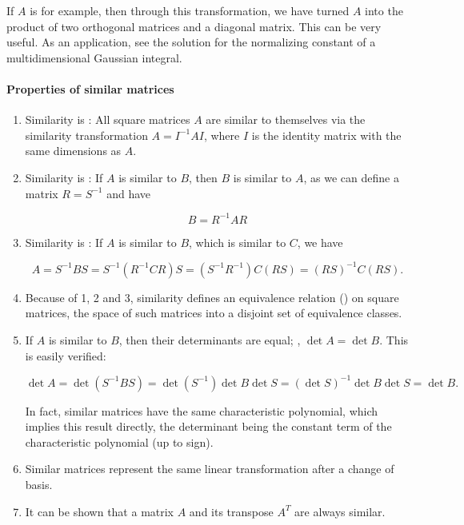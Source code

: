 \documentclass[12pt]{article}
\begin{document}
If $A$ is  for example, then through this transformation, we have turned $A$ into the product of two orthogonal matrices and a diagonal matrix.  This can be very useful.  As an application, see the solution for the normalizing constant of a multidimensional Gaussian integral.

\paragraph{Properties of similar matrices}
\begin{enumerate}
\item Similarity is : All square matrices $A$ are similar to themselves via the similarity transformation $A=I^{-1}AI$, where $I$ is the identity matrix with the same dimensions as $A$.

\item Similarity is : If $A$ is similar to $B$, then $B$ is similar to $A$, as we can define a matrix $R=S^{-1}$ and have

\begin{equation}
B=R^{-1}AR
\end{equation}

\item Similarity is : If $A$ is similar to $B$, which is similar to $C$, we have

\begin{equation}
A=S^{-1}BS=S^{-1}(R^{-1}CR)S=(S^{-1}R^{-1})C(RS)=(RS)^{-1}C(RS).
\end{equation}

\item Because of 1, 2 and 3, similarity defines an equivalence relation () on square matrices,  the space of such matrices into a disjoint set of equivalence classes.

\item If $A$ is similar to $B$, then their determinants are equal; , $\det A=\det B$.  This is easily verified:

\begin{equation}
\det A=\det(S^{-1}BS)=\det(S^{-1})\det B \det S=(\det S)^{-1}\det B \det S=\det B.
\end{equation}

In fact, similar matrices have the same characteristic polynomial, which implies this result directly, the determinant being the constant term of the characteristic polynomial (up to sign).

\item Similar matrices represent the same linear transformation after a change of basis.

\item It can be shown that a matrix $A$ and its transpose $A^T$ are always similar.
\end{enumerate}
\end{document}
